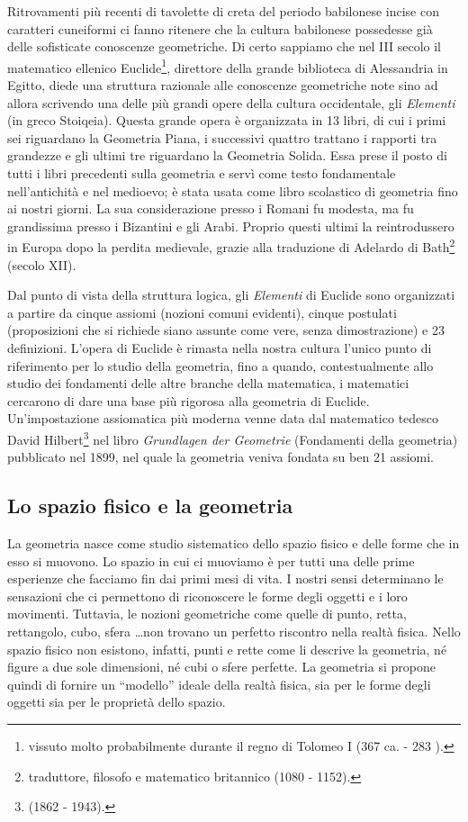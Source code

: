Ritrovamenti più recenti di tavolette di creta del periodo babilonese incise con caratteri cuneiformi ci fanno ritenere che la cultura babilonese possedesse già delle sofisticate conoscenze geometriche. Di certo sappiamo che nel III secolo \aC{} il matematico ellenico Euclide\footnote{vissuto molto probabilmente durante il regno di Tolomeo I (367 \aC{} ca. - 283 \aC).}, direttore della grande biblioteca di Alessandria in Egitto, diede una struttura razionale alle conoscenze geometriche note sino ad allora scrivendo una delle più grandi opere della cultura occidentale, gli \emph{Elementi} (in greco \textgreek{Stoiqeia}). Questa grande opera è organizzata in 13 libri, di cui i primi sei riguardano la Geometria Piana, i successivi quattro trattano i rapporti tra grandezze e gli ultimi tre riguardano la Geometria Solida. Essa prese il posto di tutti i libri precedenti sulla geometria e servì come testo fondamentale nell'antichità e nel medioevo; è stata usata come libro scolastico di geometria fino ai nostri giorni. La sua considerazione presso i Romani fu modesta, ma fu grandissima presso i Bizantini e gli Arabi. Proprio questi ultimi la reintrodussero in Europa dopo la perdita medievale, grazie alla traduzione di Adelardo di Bath\footnote{traduttore, filosofo e matematico britannico (1080 - 1152).} (secolo XII).

Dal punto di vista della struttura logica, gli \emph{Elementi} di Euclide sono organizzati a partire da cinque assiomi (nozioni comuni evidenti), cinque postulati (proposizioni che si richiede siano assunte come vere, senza dimostrazione) e 23 definizioni. L'opera di Euclide è rimasta nella nostra cultura l'unico punto di riferimento per lo studio della geometria, fino a quando, contestualmente allo studio dei fondamenti delle altre branche della matematica, i matematici cercarono di dare una base più rigorosa alla geometria di Euclide. Un'impostazione assiomatica più moderna venne data dal matematico tedesco David Hilbert\footnote{(1862 - 1943).} nel libro \emph{Grundlagen der Geometrie} (Fondamenti della geometria) pubblicato nel 1899, nel quale la geometria veniva fondata su ben 21 assiomi.

\subsection{Lo spazio fisico e la geometria}
La geometria nasce come studio sistematico dello spazio fisico e delle forme che in esso si muovono. Lo spazio in cui ci muoviamo è per tutti una delle prime esperienze che facciamo fin dai primi mesi di vita. I nostri sensi determinano le sensazioni che ci permettono di riconoscere le forme degli oggetti e i loro movimenti. Tuttavia, le nozioni geometriche come quelle di punto, retta, rettangolo, cubo, sfera \ldots non trovano un perfetto riscontro nella realtà fisica. Nello spazio fisico non esistono, infatti, punti e rette come li descrive la geometria, né figure a due sole dimensioni, né cubi o sfere perfette. La geometria si propone quindi di fornire un ``modello'' ideale della realtà fisica, sia per le forme degli oggetti sia per le proprietà dello spazio. 

